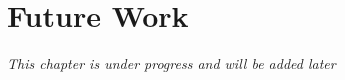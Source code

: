 
\chapter{Future Work}

\textit{This chapter is under progress and will be added later}

\begin{comment}

\section{Visualization Tool}

- Performance and efficiency
- Prediction
- Generalize even more
- More metrics
- Show architecture

\section{Case Study in Face Recognition}

\end{comment}


\cleardoublepage